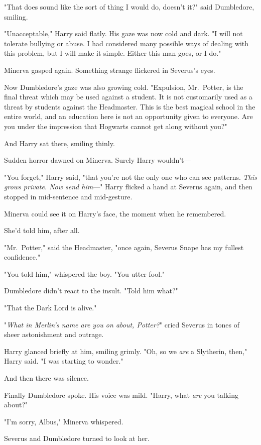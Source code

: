 "That does sound like the sort of thing I would do, doesn't it?" said
Dumbledore, smiling.

"Unacceptable," Harry said flatly. His gaze was now cold and dark. "I will not
tolerate bullying or abuse. I had considered many possible ways of dealing with
this problem, but I will make it simple. Either this man goes, or I do."

Minerva gasped again. Something strange flickered in Severus's eyes.

Now Dumbledore's gaze was also growing cold. "Expulsion, Mr.~Potter, is the
final threat which may be used against a student. It is not customarily used as
a threat by students against the Headmaster. This is the best magical school in
the entire world, and an education here is not an opportunity given to
everyone. Are you under the impression that Hogwarts cannot get along without
you?"

And Harry sat there, smiling thinly.

Sudden horror dawned on Minerva. Surely Harry wouldn't---

"You forget," Harry said, "that you're not the only one who can see patterns.
\emph{This grows private. Now send him}\mbox{---}" Harry flicked a hand at Severus
again, and then stopped in mid-sentence and mid-gesture.

Minerva could see it on Harry's face, the moment when he remembered.

She'd told him, after all.

"Mr.~Potter," said the Headmaster, "once again, Severus Snape has my fullest
confidence."

"You told him," whispered the boy. "You utter fool."

Dumbledore didn't react to the insult. "Told him what?"

"That the Dark Lord is alive."

"\emph{What in Merlin's name are you on about, Potter?}" cried Severus in tones
of sheer astonishment and outrage.

Harry glanced briefly at him, smiling grimly. "Oh, so we \emph{are} a
Slytherin, then," Harry said. "I was starting to wonder."

And then there was silence.

Finally Dumbledore spoke. His voice was mild. "Harry, what \emph{are} you
talking about?"

"I'm sorry, Albus," Minerva whispered.

Severus and Dumbledore turned to look at her.

